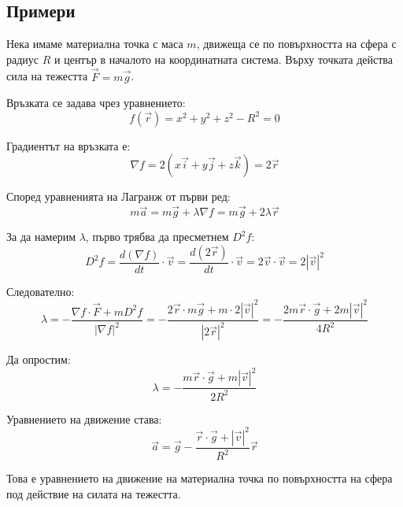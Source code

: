 \documentclass{report}
\begin{document}
\subsection{Примери}
{Нека имаме материална точка с маса $m$, движеща се по повърхността на сфера с радиус $R$ и център в началото на координатната система. Върху точката действа сила на тежестта $\vec{F} = m\vec{g}$.

Връзката се задава чрез уравнението:
\begin{equation}
f(\vec{r}) = x^2 + y^2 + z^2 - R^2 = 0
\end{equation}

Градиентът на връзката е:
\begin{equation}
\nabla f = 2(x\vec{i} + y\vec{j} + z\vec{k}) = 2\vec{r}
\end{equation}

Според уравненията на Лагранж от първи ред:
\begin{equation}
m\vec{a} = m\vec{g} + \lambda\nabla f = m\vec{g} + 2\lambda\vec{r}
\end{equation}

За да намерим $\lambda$, първо трябва да пресметнем $D^2f$:
\begin{equation}
D^2f = \frac{d(\nabla f)}{dt} \cdot \vec{v} = \frac{d(2\vec{r})}{dt} \cdot \vec{v} = 2\vec{v} \cdot \vec{v} = 2|\vec{v}|^2
\end{equation}

Следователно:
\begin{equation}
\lambda = -\frac{\nabla f \cdot \vec{F} + mD^2f}{|\nabla f|^2} = -\frac{2\vec{r} \cdot m\vec{g} + m \cdot 2|\vec{v}|^2}{|2\vec{r}|^2} = -\frac{2m\vec{r} \cdot \vec{g} + 2m|\vec{v}|^2}{4R^2}
\end{equation}

Да опростим:
\begin{equation}
\lambda = -\frac{m\vec{r} \cdot \vec{g} + m|\vec{v}|^2}{2R^2}
\end{equation}

Уравнението на движение става:
\begin{equation}
\vec{a} = \vec{g} - \frac{\vec{r} \cdot \vec{g} + |\vec{v}|^2}{R^2}\vec{r}
\end{equation}

Това е уравнението на движение на материална точка по повърхността на сфера под действие на силата на тежестта.}
\end{document}
